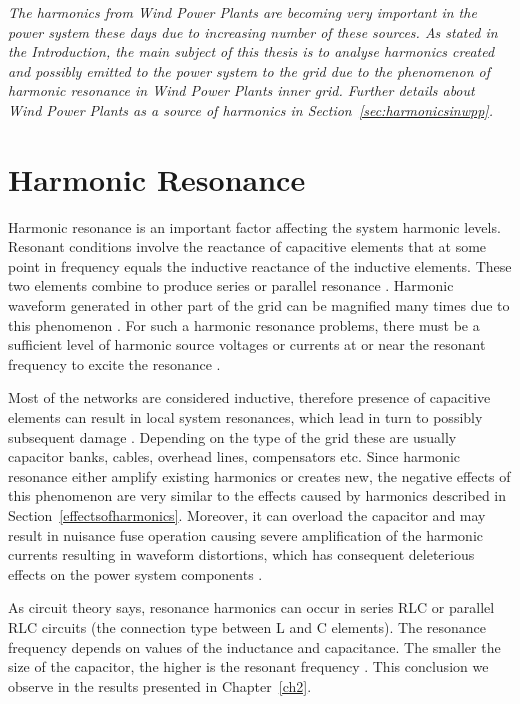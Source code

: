 \documentclass[12pt]{report} %
\begin{document}
\textit{The harmonics from Wind Power Plants are becoming very important in the power system these days due to increasing number of these sources. As stated in the Introduction, the main subject of this thesis is to analyse harmonics created and possibly emitted to the power system to the grid due to the phenomenon of harmonic resonance in Wind Power Plants inner grid. Further details about Wind Power Plants as a source of harmonics in Section~\ref{sec:harmonicsinwpp}.}

\section{Harmonic Resonance} \label{sec:harmonicresonance}
Harmonic resonance is an important factor affecting the system harmonic levels. Resonant conditions involve the reactance of capacitive elements that at some point in frequency equals the inductive reactance of the inductive elements. These two elements combine to produce series or parallel resonance \cite{rosa}. Harmonic waveform generated in other part of the grid can be magnified many times due to this phenomenon \cite{das}. For such a harmonic resonance problems, there must be a sufficient level of harmonic source voltages or currents at or near the resonant frequency to excite the resonance \cite{bradt2012}.

Most of the networks are considered inductive, therefore presence of capacitive elements can result in local system resonances, which lead in turn to possibly subsequent damage \cite{arrillaga}. Depending on the type of the grid these are usually capacitor banks, cables, overhead lines, compensators etc. Since harmonic resonance either amplify existing harmonics or creates new, the negative effects of this phenomenon are very similar to the effects caused by harmonics described in Section~\ref{effectsofharmonics}. Moreover, it can overload the capacitor and may result in nuisance fuse operation causing severe amplification of the harmonic currents resulting in waveform distortions, which has consequent deleterious effects on the power system components \cite{das}.

As circuit theory says, resonance harmonics can occur in series RLC or parallel RLC circuits (the connection type between L and C elements). The resonance frequency depends on values of the inductance and capacitance. The smaller the size of the capacitor, the higher is the resonant frequency \cite{das}. This conclusion we observe in the results presented in Chapter~\ref{ch2}.
\end{document}
